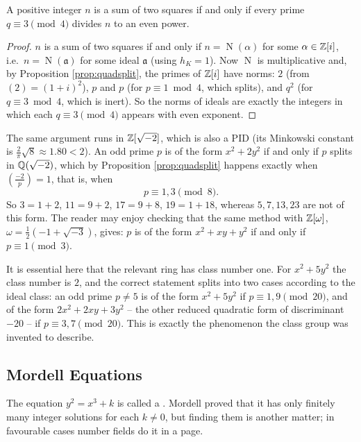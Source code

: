 \documentclass[a4paper]{scrartcl}
\newcommand{\Nm}{\operatorname{N}}
\newcommand{\fa}{\mathfrak{a}}
\newcommand{\legendre}[2]{\left( \frac{#1}{#2} \right)}
\begin{document}
\begin{corollary}
	A positive integer $n$ is a sum of two squares if and only if every prime $q \equiv 3 \pmod 4$ divides $n$ to an even power.
\end{corollary}

\begin{proof}
	$n$ is a sum of two squares if and only if $n = \Nm(\alpha)$ for some $\alpha \in \mathbb{Z}[i]$, i.e.\ $n = \Nm(\fa)$ for some ideal $\fa$ (using $h_K = 1$). Now $\Nm$ is multiplicative and, by Proposition \ref{prop:quadsplit}, the primes of $\mathbb{Z}[i]$ have norms: $2$ (from $(2) = (1+i)^2$), $p$ and $p$ (for $p \equiv 1 \bmod 4$, which splits), and $q^2$ (for $q\equiv3\bmod4$, which is inert). So the norms of ideals are exactly the integers in which each $q \equiv 3\pmod 4$ appears with even exponent.
\end{proof}

\begin{example}
	The same argument runs in $\mathbb{Z}[\sqrt{-2}]$, which is also a PID (its Minkowski constant is $\tfrac2\pi\sqrt8 \approx 1.80 < 2$). An odd prime $p$ is of the form $x^2+2y^2$ if and only if $p$ splits in $\mathbb{Q}(\sqrt{-2})$, which by Proposition \ref{prop:quadsplit} happens exactly when $\legendre{-2}{p} = 1$, that is, when
	$$p \equiv 1, 3 \pmod 8.$$
	So $3 = 1+2$, $11 = 9+2$, $17 = 9+8$, $19 = 1+18$, whereas $5, 7, 13, 23$ are not of this form. The reader may enjoy checking that the same method with $\mathbb{Z}[\omega]$, $\omega = \tfrac12(-1+\sqrt{-3})$, gives: $p$ is of the form $x^2+xy+y^2$ if and only if $p \equiv 1 \pmod 3$.
\end{example}

\begin{remark}
	It is essential here that the relevant ring has class number one. For $x^2+5y^2$ the class number is $2$, and the correct statement splits into two cases according to the ideal class: an odd prime $p \neq 5$ is of the form $x^2+5y^2$ if $p \equiv 1,9 \pmod{20}$, and of the form $2x^2+2xy+3y^2$ -- the other reduced quadratic form of discriminant $-20$ -- if $p \equiv 3,7\pmod{20}$. This is exactly the phenomenon the class group was invented to describe.
\end{remark}

\subsection{Mordell Equations}

The equation $y^2 = x^3+k$ is called a . Mordell proved that it has only finitely many integer solutions for each $k \neq 0$, but finding them is another matter; in favourable cases number fields do it in a page.
\end{document}
